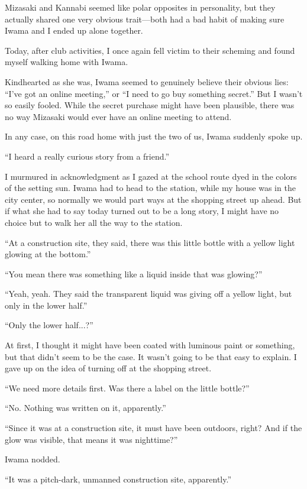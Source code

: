 \documentclass[
    a4paper,
    12pt,
    twoside,
    openany,
    UTF8,
    fontset=windows
]{ctexbook}
\begin{document}
Mizasaki and Kannabi seemed like polar opposites in personality, but they actually shared one very obvious trait---both had a bad habit of making sure Iwama and I ended up alone together.

Today, after club activities, I once again fell victim to their scheming and found myself walking home with Iwama.

Kindhearted as she was, Iwama seemed to genuinely believe their obvious lies: ``I've got an online meeting,'' or ``I need to go buy something secret.'' But I wasn't so easily fooled. While the secret purchase might have been plausible, there was no way Mizasaki would ever have an online meeting to attend.

In any case, on this road home with just the two of us, Iwama suddenly spoke up.

``I heard a really curious story from a friend.''

I murmured in acknowledgment as I gazed at the school route dyed in the colors of the setting sun. Iwama had to head to the station, while my house was in the city center, so normally we would part ways at the shopping street up ahead. But if what she had to say today turned out to be a long story, I might have no choice but to walk her all the way to the station.

``At a construction site, they said, there was this little bottle with a yellow light glowing at the bottom.''

``You mean there was something like a liquid inside that was glowing?''

``Yeah, yeah. They said the transparent liquid was giving off a yellow light, but only in the lower half.''

``Only the lower half...?''

At first, I thought it might have been coated with luminous paint or something, but that didn't seem to be the case. It wasn't going to be that easy to explain. I gave up on the idea of turning off at the shopping street.

``We need more details first. Was there a label on the little bottle?''

``No. Nothing was written on it, apparently.''

``Since it was at a construction site, it must have been outdoors, right? And if the glow was visible, that means it was nighttime?''

Iwama nodded.

``It was a pitch-dark, unmanned construction site, apparently.''
\end{document}
